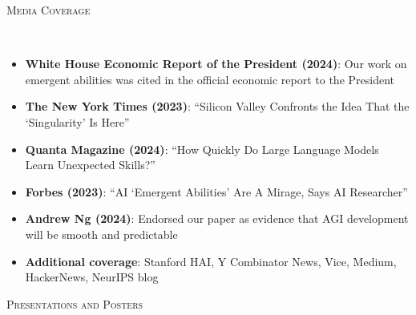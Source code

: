 \documentclass{article}
\newenvironment{changemargin}[2]{%
  \begin{list}{}{%
    \setlength{\topsep}{0pt}%
    \setlength{\leftmargin}{#1}%
    \setlength{\rightmargin}{#2}%
    \setlength{\listparindent}{\parindent}%
    \setlength{\itemindent}{\parindent}%
    \setlength{\parsep}{\parskip}%
  }%
  \item[]}{\end{list}
}
\newcommand{\lineover}{
	\begin{changemargin}{-0.05in}{-0.05in}
		\vspace*{-8pt}
		\hrulefill \\
		\vspace*{-2pt}
	\end{changemargin}
}
\newcommand{\header}[1]{
	\begin{changemargin}{-0.5in}{-0.5in}
		\scshape{#1}\\
  	\lineover
	\end{changemargin}
}
\newenvironment{body} {
	\vspace*{-16pt}
	\begin{changemargin}{-0.25in}{-0.5in}
  }	
	{\end{changemargin}
}
\begin{document}

\header{Media Coverage}
\begin{body}
\vspace{16pt}
\begin{itemize} \itemsep -2pt
    \item \textbf{White House Economic Report of the President (2024)}: Our work on emergent abilities was cited in the official economic report to the President
    \item \textbf{The New York Times (2023)}: ``Silicon Valley Confronts the Idea That the `Singularity' Is Here''
    \item \textbf{Quanta Magazine (2024)}: ``How Quickly Do Large Language Models Learn Unexpected Skills?''
    \item \textbf{Forbes (2023)}: ``AI `Emergent Abilities' Are A Mirage, Says AI Researcher''
    \item \textbf{Andrew Ng (2024)}: Endorsed our paper as evidence that AGI development will be smooth and predictable
    \item \textbf{Additional coverage}: Stanford HAI, Y Combinator News, Vice, Medium, HackerNews, NeurIPS blog
\end{itemize}
\end{body}


\header{Presentations and Posters}
\end{document}
